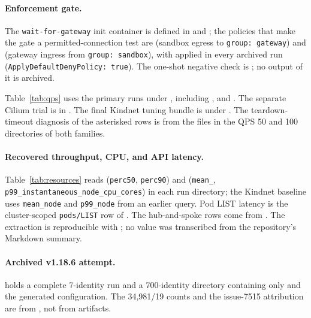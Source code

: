 \documentclass[letterpaper,twocolumn,10pt]{article}
\begin{document}
\paragraph{Enforcement gate.}
The \texttt{wait-for-gateway} init container is defined in
 and
; the policies that make the gate a
permitted-connection test are  (sandbox
egress to \texttt{group: gateway}) and 
(gateway ingress from \texttt{group: sandbox}), with
 applied in every archived run
(\texttt{ApplyDefaultDenyPolicy: true}). The one-shot negative check is
; no output of it is archived.

Table~\ref{tab:qps} uses the primary runs under
, including
, and
.
The separate Cilium trial is in .
The final Kindnet tuning bundle is under
.
The teardown-timeout diagnosis of the asterisked rows is from the
 files in the QPS 50 and 100 directories of both
families.

\paragraph{Recovered throughput, CPU, and API latency.}
Table~\ref{tab:resources} reads 
(\texttt{perc50}, \texttt{perc90}) and
(\texttt{mean\_}, \texttt{p99\_instantaneous\_node\_cpu\_cores}) in
each run directory; the Kindnet baseline uses \texttt{mean\_node} and
\texttt{p99\_node} from an earlier query. Pod LIST latency is the
cluster-scoped \texttt{pods/LIST} row of
. The hub-and-spoke
rows come from .
The extraction is reproducible with ;
no value was transcribed from the repository's Markdown summary.

\paragraph{Archived v1.18.6 attempt.}
 holds a complete
7-identity run and a 700-identity directory containing only
 and the generated configuration. The
34,981/19 counts and the issue-7515 attribution are from
, not from artifacts.
\end{document}
